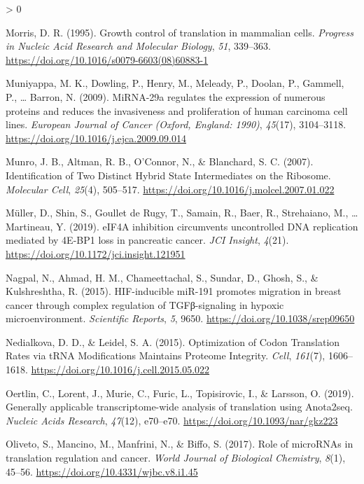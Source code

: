 \documentclass[
  12pt,
  openany]{book}
\newlength{\cslhangindent}
\newenvironment{CSLReferences}[2] %
 {%
  \setlength{\parindent}{0pt}
  \ifodd #1 \everypar{\setlength{\hangindent}{\cslhangindent}}\ignorespaces\fi
  \ifnum #2 > 0
  \setlength{\parskip}{#2\baselineskip}
  \fi
 }%
 {}
\begin{document}
\begin{CSLReferences}{1}{0}
\leavevmode\hypertarget{ref-Morris1995}{}%
Morris, D. R. (1995). Growth control of translation in mammalian cells. \emph{Progress in Nucleic Acid Research and Molecular Biology}, \emph{51}, 339--363. \url{https://doi.org/10.1016/s0079-6603(08)60883-1}

\leavevmode\hypertarget{ref-Muniyappa2009}{}%
Muniyappa, M. K., Dowling, P., Henry, M., Meleady, P., Doolan, P., Gammell, P., \ldots{} Barron, N. (2009). {MiRNA}-29a regulates the expression of numerous proteins and reduces the invasiveness and proliferation of human carcinoma cell lines. \emph{European Journal of Cancer (Oxford, England: 1990)}, \emph{45}(17), 3104--3118. \url{https://doi.org/10.1016/j.ejca.2009.09.014}

\leavevmode\hypertarget{ref-Munro2007}{}%
Munro, J. B., Altman, R. B., O'Connor, N., \& Blanchard, S. C. (2007). Identification of {Two Distinct Hybrid State Intermediates} on the {Ribosome}. \emph{Molecular Cell}, \emph{25}(4), 505--517. \url{https://doi.org/10.1016/j.molcel.2007.01.022}

\leavevmode\hypertarget{ref-Muller2019}{}%
Müller, D., Shin, S., Goullet de Rugy, T., Samain, R., Baer, R., Strehaiano, M., \ldots{} Martineau, Y. (2019). {eIF4A} inhibition circumvents uncontrolled {DNA} replication mediated by {4E}-{BP1} loss in pancreatic cancer. \emph{JCI Insight}, \emph{4}(21). \url{https://doi.org/10.1172/jci.insight.121951}

\leavevmode\hypertarget{ref-Nagpal2015}{}%
Nagpal, N., Ahmad, H. M., Chameettachal, S., Sundar, D., Ghosh, S., \& Kulshreshtha, R. (2015). {HIF}-inducible {miR}-191 promotes migration in breast cancer through complex regulation of {TGFβ}-signaling in hypoxic microenvironment. \emph{Scientific Reports}, \emph{5}, 9650. \url{https://doi.org/10.1038/srep09650}

\leavevmode\hypertarget{ref-Nedialkova2015}{}%
Nedialkova, D. D., \& Leidel, S. A. (2015). Optimization of {Codon Translation Rates} via {tRNA Modifications Maintains Proteome Integrity}. \emph{Cell}, \emph{161}(7), 1606--1618. \url{https://doi.org/10.1016/j.cell.2015.05.022}

\leavevmode\hypertarget{ref-Oertlin2019}{}%
Oertlin, C., Lorent, J., Murie, C., Furic, L., Topisirovic, I., \& Larsson, O. (2019). Generally applicable transcriptome-wide analysis of translation using Anota2seq. \emph{Nucleic Acids Research}, \emph{47}(12), e70--e70. \url{https://doi.org/10.1093/nar/gkz223}

\leavevmode\hypertarget{ref-Oliveto2017}{}%
Oliveto, S., Mancino, M., Manfrini, N., \& Biffo, S. (2017). Role of {microRNAs} in translation regulation and cancer. \emph{World Journal of Biological Chemistry}, \emph{8}(1), 45--56. \url{https://doi.org/10.4331/wjbc.v8.i1.45}


\end{CSLReferences}
\end{document}
